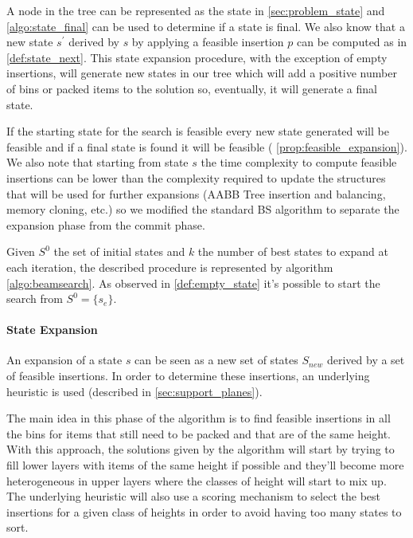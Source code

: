 A node in the tree can be represented as the state in \cref{sec:problem_state} and \cref{algo:state_final} can be used to determine if a state is final. We also know that a new state $s^\prime$ derived by $s$ by applying a feasible insertion $p$ can be computed as in \cref{def:state_next}.
This state expansion procedure, with the exception of empty insertions, will generate new states in our tree which will add a positive number of bins or packed items to the solution so, eventually, it will generate a final state.

If the starting state for the search is feasible every new state generated will be feasible and if a final state is found it will be feasible ( \cref{prop:feasible_expansion}).
We also note that starting from state $s$ the time complexity to compute feasible insertions can be lower than the complexity required to update the structures that will be used for further expansions (AABB Tree insertion and balancing, memory cloning, etc.) so we modified the standard BS algorithm to separate the expansion phase from the commit phase.

Given $S^0$ the set of initial states and $k$ the number of best states to expand at each iteration, the described procedure is represented by algorithm \ref{algo:beamsearch}.
As observed in \cref{def:empty_state} it's possible to start the search from $S^0 = \{ s_e \}$.



\paragraph*{State Expansion}

An expansion of a state $s$ can be seen as a new set of states $S_{new}$ derived by a set of feasible insertions.
In order to determine these insertions, an underlying heuristic is used (described in \cref{sec:support_planes}).

The main idea in this phase of the algorithm is to find feasible insertions in all the bins for items that still need to be packed and that are of the same height.
With this approach, the solutions given by the algorithm will start by trying to fill lower layers with items of the same height if possible and they'll become more heterogeneous in upper layers where the classes of height will start to mix up.
The underlying heuristic will also use a scoring mechanism to select the best insertions for a given class of heights in order to avoid having too many states to sort.


